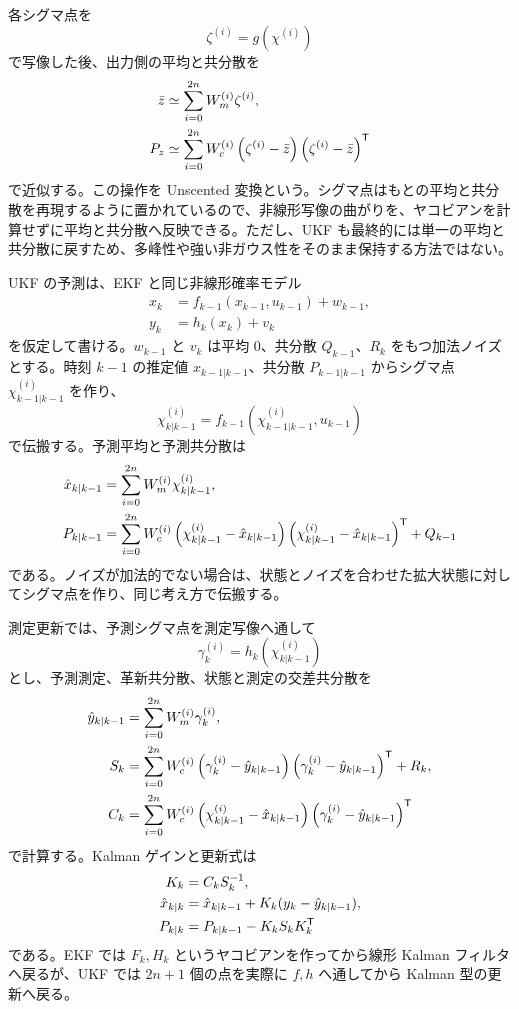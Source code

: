 各シグマ点を
\begin{equation}
  \zeta^{(i)}=g(\chi^{(i)})
\end{equation}
で写像した後、出力側の平均と共分散を
\begin{align}
  \bar{z}
  &\simeq \sum_{i=0}^{2n}W_m^{(i)}\zeta^{(i)},\\
  P_z
  &\simeq \sum_{i=0}^{2n}W_c^{(i)}
  \left(\zeta^{(i)}-\bar{z}\right)
  \left(\zeta^{(i)}-\bar{z}\right)^{\mathsf{T}}
\end{align}
で近似する。この操作を Unscented 変換という。シグマ点はもとの平均と共分散を再現するように置かれているので、非線形写像の曲がりを、ヤコビアンを計算せずに平均と共分散へ反映できる。ただし、UKF も最終的には単一の平均と共分散に戻すため、多峰性や強い非ガウス性をそのまま保持する方法ではない。

UKF の予測は、EKF と同じ非線形確率モデル
\begin{align}
  x_k&=f_{k-1}(x_{k-1},u_{k-1})+w_{k-1},\\
  y_k&=h_k(x_k)+v_k
\end{align}
を仮定して書ける。$w_{k-1}$ と $v_k$ は平均 0、共分散 $Q_{k-1}$、$R_k$ をもつ加法ノイズとする。時刻 $k-1$ の推定値 $\hat{x}_{k-1|k-1}$、共分散 $P_{k-1|k-1}$ からシグマ点 $\chi_{k-1|k-1}^{(i)}$ を作り、
\begin{equation}
  \chi_{k|k-1}^{(i)}
  =
  f_{k-1}(\chi_{k-1|k-1}^{(i)},u_{k-1})
\end{equation}
で伝搬する。予測平均と予測共分散は
\begin{align}
  \hat{x}_{k|k-1}
  &=\sum_{i=0}^{2n}W_m^{(i)}\chi_{k|k-1}^{(i)},\\
  P_{k|k-1}
  &=\sum_{i=0}^{2n}W_c^{(i)}
  \left(\chi_{k|k-1}^{(i)}-\hat{x}_{k|k-1}\right)
  \left(\chi_{k|k-1}^{(i)}-\hat{x}_{k|k-1}\right)^{\mathsf{T}}
  +Q_{k-1}
\end{align}
である。ノイズが加法的でない場合は、状態とノイズを合わせた拡大状態に対してシグマ点を作り、同じ考え方で伝搬する。

測定更新では、予測シグマ点を測定写像へ通して
\begin{equation}
  \gamma_k^{(i)}=h_k(\chi_{k|k-1}^{(i)})
\end{equation}
とし、予測測定、革新共分散、状態と測定の交差共分散を
\begin{align}
  \hat{y}_{k|k-1}
  &=\sum_{i=0}^{2n}W_m^{(i)}\gamma_k^{(i)},\\
  S_k
  &=\sum_{i=0}^{2n}W_c^{(i)}
  \left(\gamma_k^{(i)}-\hat{y}_{k|k-1}\right)
  \left(\gamma_k^{(i)}-\hat{y}_{k|k-1}\right)^{\mathsf{T}}
  +R_k,\\
  C_k
  &=\sum_{i=0}^{2n}W_c^{(i)}
  \left(\chi_{k|k-1}^{(i)}-\hat{x}_{k|k-1}\right)
  \left(\gamma_k^{(i)}-\hat{y}_{k|k-1}\right)^{\mathsf{T}}
\end{align}
で計算する。Kalman ゲインと更新式は
\begin{align}
  K_k&=C_kS_k^{-1},\\
  \hat{x}_{k|k}
  &=\hat{x}_{k|k-1}+K_k(y_k-\hat{y}_{k|k-1}),\\
  P_{k|k}
  &=P_{k|k-1}-K_kS_kK_k^{\mathsf{T}}
\end{align}
である。EKF では $F_k,H_k$ というヤコビアンを作ってから線形 Kalman フィルタへ戻るが、UKF では $2n+1$ 個の点を実際に $f,h$ へ通してから Kalman 型の更新へ戻る。

